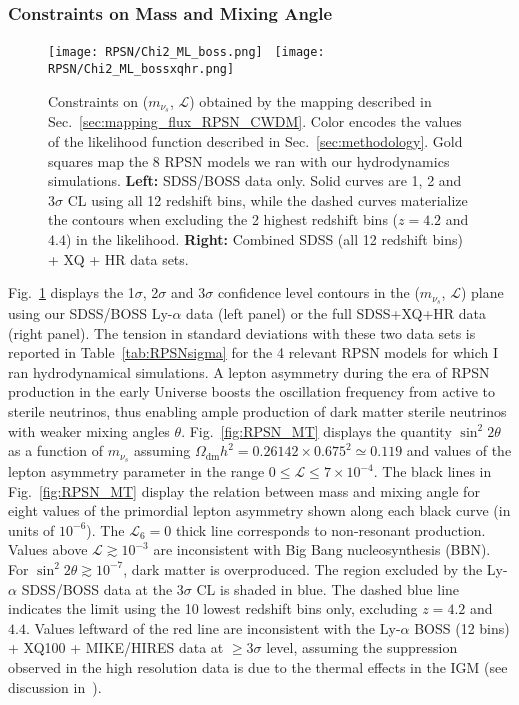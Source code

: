\subsubsection{Constraints on Mass and Mixing Angle}


\begin{figure}
\begin{center}
  \texttt{[image: RPSN/Chi2\_ML\_boss.png]}~%
  \texttt{[image: RPSN/Chi2\_ML\_bossxqhr.png]}
  \caption{Constraints on ($m_{\nu_s}$, $\mathcal{L}$) obtained by the mapping
    described in Sec.~\ref{sec:mapping_flux_RPSN_CWDM}. Color encodes the values of the likelihood function described in Sec.~\ref{sec:methodology}. Gold squares map the 8 RPSN models we ran with our hydrodynamics simulations. \textbf{Left:} SDSS/BOSS data only. Solid curves are
    1, 2 and $3\sigma$ CL using all 12 redshift bins, while the dashed curves
    materialize the contours when excluding the 2 highest redshift bins ($z=4.2$
    and $4.4$) in the likelihood. \textbf{Right:} Combined SDSS (all 12 redshift bins) + XQ +
    HR data sets.
    }
\label{fig:RPSN_ML}
\end{center}
\end{figure}

Fig.~\ref{fig:RPSN_ML} displays the 1$\sigma$, 2$\sigma$ and 3$\sigma$ confidence level contours in the
($m_{\nu_s}$, $\mathcal{L}$) plane using our SDSS/BOSS Ly-$\alpha$
data  (left panel) or the full SDSS+XQ+HR  data (right
panel). The tension in standard deviations with these two data sets is reported in Table~\ref{tab:RPSNsigma} for the 4 relevant RPSN models for which I ran hydrodynamical simulations. A lepton asymmetry during the era of RPSN production in the early Universe
boosts the oscillation frequency from active to sterile neutrinos, thus
enabling ample production of dark matter sterile neutrinos with weaker mixing
angles $\theta$. Fig.~\ref{fig:RPSN_MT} displays the quantity $\sin^2 2 \theta$ as a function of $m_{\nu_s}$ assuming $\Omega_{\mathrm{dm}} h^2 = 0.26142 \times 0.675^2\simeq 0.119$ and values of the lepton asymmetry parameter in the range $0 \leq \mathcal{L} \leq 7 \times 10^{-4}$. The black lines in Fig.~\ref{fig:RPSN_MT} display the relation between  mass and mixing angle  for eight values of the primordial lepton asymmetry shown along each black curve (in  units of $10^{-6}$). The $\mathcal{L}_6 = 0$ thick line corresponds to non-resonant production. Values above $\mathcal{L} \gtrsim 10^{-3}$ are inconsistent with Big Bang nucleosynthesis (BBN). For $\sin^2 2 \theta \gtrsim 10^{-7}$, dark matter is overproduced. The region excluded by the Ly-$\alpha$ SDSS/BOSS data at the  $3\sigma$ CL is shaded in blue.  The dashed blue line indicates the limit using the 10 lowest redshift bins only, excluding $z=4.2$ and $4.4$. Values leftward of the red line are inconsistent with the Ly-$\alpha$ BOSS (12 bins) + XQ100 + MIKE/HIRES data at $\ge 3\sigma$ level, assuming the suppression observed in the high resolution data is  due to the thermal effects in the IGM (see discussion in~\cite{warmIGM}). \\


